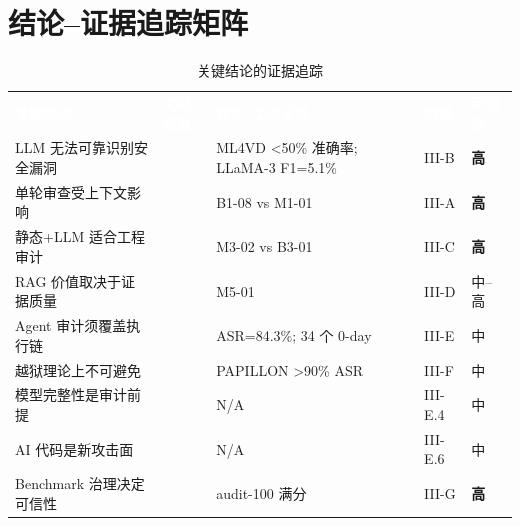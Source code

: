 \documentclass[11pt,a4paper,onecolumn]{article}
\newcommand{\tabheader}[1]{\textcolor{white}{\textbf{#1}}}
\begin{document}
\section{结论--证据追踪矩阵}
\begin{table}[t]
\caption{关键结论的证据追踪}
\label{tab:evidence_trace}
\centering
\begin{tabularx}{\textwidth}{@{} X X X p{} p{} @{}}
\rowcolor{tabhead}
\tabheader{关键结论} & \tabheader{文献证据} & \tabheader{样本/工件证据} & \tabheader{位置} & \tabheader{可信度} \\
\rowcolor{tabalt} LLM 无法可靠识别安全漏洞 & \cite{paquette2024llmscannot,ullaha_vuln_reasoning_2024,risse2024limits,niu2025largetomammoth} & ML4VD <50\% 准确率; LLaMA-3 F1=5.1\% & III-B & \textbf{高} \\
单轮审查受上下文影响 & \cite{liu_security_review_2024,cihan_2025_llm_review_eval,tufano_2024_strengths_weaknesses} & B1-08 vs M1-01 & III-A & \textbf{高} \\
\rowcolor{tabalt} 静态+LLM 适合工程审计 & \cite{program_analysis_survey_2025,llmxcpg_2025,charoenwet_2024_sast_secure_review} & M3-02 vs B3-01 & III-C & \textbf{高} \\
RAG 价值取决于证据质量 & \cite{tan2026prarag,hong_2025_rag_review,llmxcpg_2025} & M5-01 & III-D & 中--高 \\
\rowcolor{tabalt} Agent 审计须覆盖执行链 & \cite{debenedetti2024agentdojo,zhang2024asb,liu2025taintstyle,liu2026malskills} & ASR=84.3\%; 34 个 0-day & III-E & 中 \\
越狱理论上不可避免 & \cite{su2024missionimpossible,gong2025safetyMisalign,chao2024jailbreakbench,gong2025papillon} & PAPILLON >90\% ASR & III-F & 中 \\
\rowcolor{tabalt} 模型完整性是审计前提 & \cite{wei2024lmsanitator,zhang2024instrbackdoor,philosophers2025,yan2024llmbackdoor} & N/A & III-E.4 & 中 \\
AI 代码是新攻击面 & \cite{pearce2023copilot_correctness,indict2024,trust_copilot2025} & N/A & III-E.6 & 中 \\
\rowcolor{tabalt} Benchmark 治理决定可信性 & \cite{chao2024jailbreakbench,zhang2024asb,sok2025avr} & audit-100 满分 & III-G & \textbf{高} \\
\end{tabularx}
\end{table}
\end{document}
